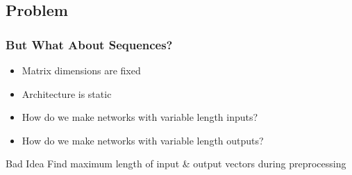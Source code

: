 \documentclass[pdf]{beamer}
\begin{document}
\subsection{Problem}
\begin{frame}
  
  \frametitle{But What About Sequences?}
  \begin{itemize}
  \item Matrix dimensions are fixed
  \item Architecture is static
  \item How do we make networks with variable length inputs?
  \item How do we make networks with variable length outputs?
  \end{itemize}
  \pause
  \begin{alertblock}{Bad Idea}
    Find maximum length of input \& output vectors during preprocessing
  \end{alertblock}
  
\end{frame}
\end{document}
